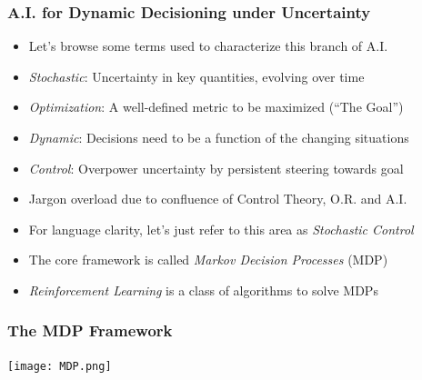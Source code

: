 \documentclass[handout]{beamer}
\begin{document}
\begin{frame}
\frametitle{A.I. for Dynamic Decisioning under Uncertainty}
\pause
\begin{itemize}[<+->]
\item Let's browse some terms used to characterize this branch of A.I.
\item {\em Stochastic}: Uncertainty in key quantities, evolving over time
\item {\em Optimization}: A well-defined metric to be maximized (``The Goal'')
\item {\em Dynamic}:  Decisions need to be a function of the changing situations
\item {\em Control}: Overpower uncertainty by persistent steering towards goal
\item Jargon overload due to confluence of Control Theory, O.R. and A.I.
\item For language clarity, let's just refer to this area as {\em Stochastic Control}
\item The core framework is called {\em Markov Decision Processes} (MDP)
\item {\em Reinforcement Learning} is a class of algorithms to solve MDPs
\end{itemize}
\end{frame}



\begin{frame}
\frametitle{The MDP Framework}
\texttt{[image: MDP.png]}
\end{frame}
\end{document}
